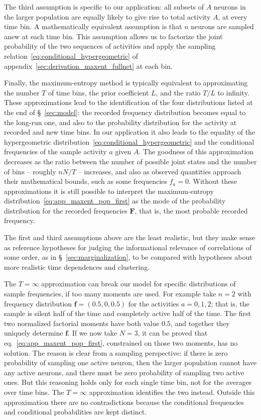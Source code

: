 \documentclass[\ifafour a4paper,12pt,\else a5paper,10pt,\fi%
onecolumn,oneside,article,%
british%
]{memoir}
\theoremstyle{remark}
\theoremstyle{innote}
\renewcommand*{\|}{\nonscript\,\vert\nonscript\;\mathopen{}}
\newcommand*{\sect}{\S}%
\newcommand*{\eqn}{eq.}%
\newcommand*{\yAv}{A}
\newcommand*{\yav}{a}
\newcommand*{\yFF}{F}
\newcommand*{\yff}{f}
\newcommand*{\yF}{\bm{\yFF}}
\newcommand*{\yf}{\bm{\yff}}
\newcommand*{\ya}{\yav}%
\newcommand*{\yA}{\yAv}%
\begin{document}
The third assumption is specific to our application: all subsets of $\yA$
neurons in the larger population are equally likely to give rise to total
activity $\yA$, at every time bin. A mathematically equivalent assumption
is that $n$ neurons are sampled anew at each time bin. This assumption
allows us to factorize the joint probability of the two sequences of
activities and apply the sampling
relation~\eqref{eq:conditional_hypergeometric} of
appendix~\ref{sec:derivation_maxent_fullnet} at each bin.

Finally, the maximum-entropy method is typically equivalent to
approximating the number $T$ of time bins, the prior coefficient $L$, and
the ratio $T/L$ to infinity. These approximations lead to the
identification of the four distributions listed at the end of
\sect~\ref{sec:model}: the recorded frequency distribution becomes equal to
the long-run one, and also to the probability distribution for the activity
at recorded and new time bins. In our application it also leads to the
equality of the hypergeometric
distribution~\eqref{eq:conditional_hypergeometric} and the conditional
frequencies of the sample activity $\ya$ given $\yA$. The goodness of this
approximation decreases as the ratio between the number of possible joint
states and the number of bins -- roughly $nN/T$ -- increases, and also as
observed quantities approach their mathematical bounds, such as some
frequencies $\yff_{\ya}=0$. Without these approximations it is still
possible to interpret the maximum-entropy
distribution~\eqref{eq:app_maxent_pop_first} as the mode of the probability
distribution for the recorded frequencies $\yF$, that is, the most probable
recorded frequency.


\medskip

The first and third assumptions above are the least realistic, but they
make sense as reference hypotheses for judging the informational relevance
of correlations of some order, as in \sect~\ref{sec:marginalization}, to be
compared with hypotheses about more realistic time dependences and
clustering. %

The $T= \infty$ approximation can break our model for specific
distributions of sample frequencies, if too many moments are used. For
example take $n=2$ with frequency distribution $\yf=(0.5,0,0.5)$ for the
activities $\ya=0,1,2$; that is, the sample is silent half of the time and
completely active half of the time. The first two normalized factorial
moments have both value $0.5$, and together they uniquely determine $\yf$.
If we now take $N=3$, it can be proved that
\eqn~\eqref{eq:app_maxent_pop_first}, constrained on those two moments, has
no solution. The reason is clear from a sampling perspective: if there is
zero probability of sampling one active neuron, then the larger population
cannot have any active neurons, and there must be zero probability of
sampling two active ones. But this reasoning holds only for each single
time bin, not for the averages over time bins. The $T=\infty$ approximation
identifies the two instead. Outside this approximation there are no
contradictions because the conditional frequencies and conditional
probabilities are kept distinct.
\end{document}
